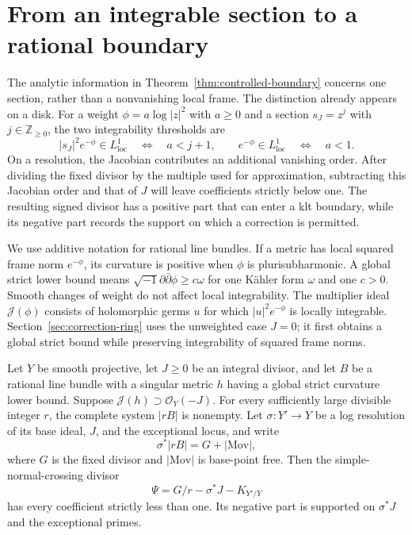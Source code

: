 \section{From an integrable section to a rational boundary}
\label{sec:approximation}

The analytic information in Theorem~\ref{thm:controlled-boundary}
concerns one section, rather than a nonvanishing local frame.  The
distinction already appears on a disk.  For a weight
$\phi=a\log|z|^2$ with $a\ge0$ and a section $s_J=z^j$ with
$j\in\mathbb Z_{\ge0}$, the two integrability thresholds are
\[
 |s_J|^2e^{-\phi}\in L^1_{\mathrm{loc}}
       \quad\Longleftrightarrow\quad a<j+1,
 \qquad
 e^{-\phi}\in L^1_{\mathrm{loc}}
       \quad\Longleftrightarrow\quad a<1.
\]
On a resolution, the Jacobian contributes an additional vanishing
order.  After dividing the fixed divisor by the multiple used for
approximation, subtracting this Jacobian order and that of $J$ will
leave coefficients strictly below one.  The resulting signed divisor
has a positive part that can enter a klt boundary, while its negative
part records the
support on which a correction is permitted.

We use additive notation for rational line bundles.  If a metric has
local squared frame norm $e^{-\phi}$, its curvature is positive when
$\phi$ is plurisubharmonic.  A global strict lower bound means
$\sqrt{-1}\partial\bar\partial\phi\ge c\omega$ for one K\"ahler form
$\omega$ and one $c>0$.  Smooth changes of weight do not affect local
integrability.  The multiplier ideal $\mathcal J(\phi)$ consists of
holomorphic germs $u$ for which $|u|^2e^{-\phi}$ is locally integrable.
Section~\ref{sec:correction-ring} uses the unweighted case $J=0$;
it first obtains a global strict bound while preserving integrability
of squared frame norms.

\begin{lemma}
\label{lem:weighted-resolution}
Let $Y$ be smooth projective, let $J\ge0$ be an integral divisor, and
let $B$ be a rational line bundle with a singular metric $h$ having a
global strict curvature lower bound.  Suppose
$\mathcal J(h)\supset\mathcal O_Y(-J)$.
For every sufficiently large divisible integer $r$, the complete system
$|rB|$ is nonempty.  Let $\sigma:Y'\to Y$ be a log resolution of its
base ideal, $J$, and the exceptional locus, and write
\[
 \sigma^*|rB|=G+|\mathrm{Mov}|,
\]
where $G$ is the fixed divisor and $|\mathrm{Mov}|$ is base-point free.
Then the simple-normal-crossing divisor
\begin{equation}\label{eq:weighted-signed-divisor}
 \Psi=G/r-\sigma^*J-K_{Y'/Y}
\end{equation}
has every coefficient strictly less than one.  Its negative part is
supported on $\sigma^*J$ and the exceptional primes.
\end{lemma}

